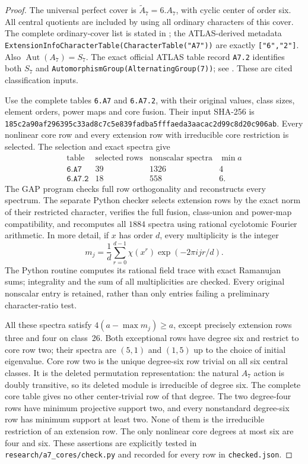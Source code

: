 \begin{proof}
The universal perfect cover is $\widetilde A_7=6.A_7$, with cyclic
center of order six. All central quotients are included by using all
ordinary characters of this cover. The complete ordinary-cover list
is stated in \cite[Chapter~4, opening paragraph, p.~31]{BI:HHM};
the ATLAS-derived metadata
\texttt{ExtensionInfoCharacterTable(CharacterTable("A7"))}
are exactly \texttt{["6","2"]}. Also
$\operatorname{Aut}(A_7)=S_7$. The exact official ATLAS table record
\texttt{A7.2} identifies both $S_7$ and
\texttt{AutomorphismGroup(AlternatingGroup(7))}; see
\cite{HD:A7Tables}. These are cited classification inputs.

Use the complete tables \texttt{6.A7} and \texttt{6.A7.2}, with
their original values, class sizes, element orders, power maps and
core fusion. Their input SHA-256 is
\texttt{185c2a90af296395c33ad8c7c5e839fadba5fffaeda3aacac2d99c8d20c906ab}.
Every nonlinear core row and every extension row with irreducible
core restriction is selected. The selection and exact spectra give
\[
\begin{array}{c|r|r|r}
\text{table}&\text{selected rows}&\text{nonscalar spectra}&\min a\\\hline
\texttt{6.A7}&39&1326&4\\
\texttt{6.A7.2}&18&558&6.
\end{array}                                                   \tag{A7.2}
\]
The GAP program checks full row orthogonality and reconstructs every
spectrum. The separate Python checker selects extension rows by the
exact norm of their restricted character, verifies the full fusion,
class-union and power-map compatibility, and recomputes all $1884$
spectra using rational cyclotomic Fourier arithmetic. In more detail,
if $x$ has order $d$, every multiplicity is the integer
\[
             m_j=\frac1d\sum_{r=0}^{d-1}
                    \chi(x^r)\exp(-2\pi i jr/d).          \tag{A7.3}
\]
The Python routine computes its rational field trace with exact
Ramanujan sums; integrality and the sum of all multiplicities are
checked. Every original nonscalar entry is retained, rather than
only entries failing a preliminary character-ratio test.

All these spectra satisfy $4(a-\max m_j)\ge a$, except precisely
extension rows three and four on class~26. Both exceptional rows
have degree six and restrict to core row two; their spectra are
$(5,1)$ and $(1,5)$ up to the choice of initial eigenvalue. Core
row two is the unique degree-six row trivial on all six central
classes. It is the deleted permutation representation: the natural
$A_7$ action is doubly transitive, so its deleted module is
irreducible of degree six. The complete core table gives no other
center-trivial row of that degree. The two degree-four rows have
minimum projective support two, and every nonstandard degree-six
row has minimum support at least two. None of them is the
irreducible restriction of an extension row. The only nonlinear
core degrees at most six are four and six. These assertions are
explicitly tested in \texttt{research/a7\_cores/check.py} and
recorded for every row in \texttt{checked.json}.


\end{proof}

